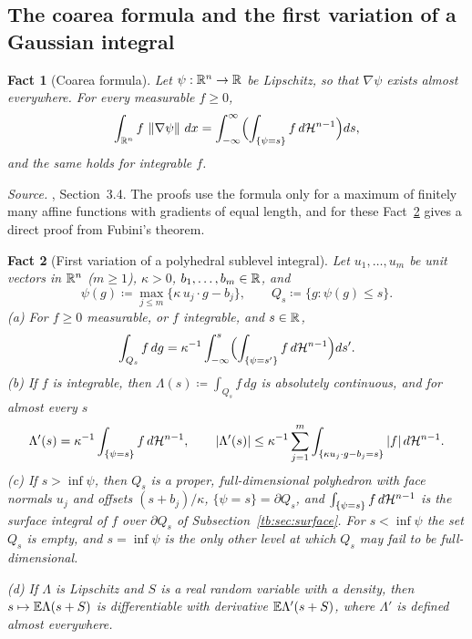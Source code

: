 \documentclass[11pt,letterpaper]{article}
\theoremstyle{plain}
\newtheorem{fact}{Fact}[section]
\begin{document}
\subsection{The coarea formula and the first variation of a Gaussian
integral}\label{tb:sec:coarea}

\begin{fact}[Coarea formula]\label{tb:coarea}
Let \(\psi:\mathbb R^n\to\mathbb R\) be Lipschitz, so that \(\nabla\psi\) exists almost
everywhere. For every measurable \(f\ge0\),
\[
 \int_{\mathbb R^n}f\,\left\lVert\nabla\psi\right\rVert\,dx=\int_{-\infty}^\infty
 \Bigl(\int_{\{\psi=s\}}f\,d\mathcal H^{n-1}\Bigr)ds ,
\]
and the same holds for integrable \(f\).
\end{fact}

\emph{Source.} , Section~3.4. The proofs use the formula only for
a maximum of finitely many affine functions with gradients of equal length, and
for these Fact~\ref{tb:variation} gives a direct proof from Fubini's theorem.

\begin{fact}[First variation of a polyhedral sublevel integral]\label{tb:variation}
Let \(u_1,\ldots,u_m\) be unit vectors in \(\mathbb R^n\) (\(m\ge1\)), \(\kappa>0\),
\(b_1,\ldots,b_m\in\mathbb R\), and
\[
 \psi(g)\coloneqq \max_{j\le m}\{\kappa\,u_j\cdot g-b_j\},\qquad Q_s\coloneqq \{g:\psi(g)\le s\}.
\]
(a) For \(f\ge0\) measurable, or \(f\) integrable, and \(s\in\mathbb R\),
\[
 \int_{Q_s}f\,dg=\kappa^{-1}\int_{-\infty}^s\Bigl(\int_{\{\psi=s'\}}f\,d\mathcal H^{n-1}
 \Bigr)ds'.
\]
(b) If \(f\) is integrable, then \(\Lambda(s)\coloneqq \int_{Q_s}f\,dg\) is absolutely
continuous, and for almost every \(s\)
\[
 \Lambda'(s)=\kappa^{-1}\int_{\{\psi=s\}}f\,d\mathcal H^{n-1},\qquad
 |\Lambda'(s)|\le\kappa^{-1}\sum_{j=1}^m\int_{\{\kappa u_j\cdot g-b_j=s\}}|f|\,d\mathcal H^{n-1}.
\]
(c) If \(s>\inf\psi\), then \(Q_s\) is a proper, full-dimensional polyhedron
with face normals \(u_j\) and offsets \((s+b_j)/\kappa\), \(\{\psi=s\}=\partial Q_s\),
and \(\int_{\{\psi=s\}}f\,d\mathcal H^{n-1}\) is the surface integral of \(f\) over
\(\partial Q_s\) of Subsection~\ref{tb:sec:surface}. For \(s<\inf\psi\) the set
\(Q_s\) is empty, and \(s=\inf\psi\) is the only other level at which \(Q_s\)
may fail to be full-dimensional.

(d) If \(\Lambda\) is Lipschitz and \(S\) is a real random variable with a
density, then \(s\mapsto\mathbb E\Lambda(s+S)\) is differentiable with derivative
\(\mathbb E\Lambda'(s+S)\), where \(\Lambda'\) is defined almost everywhere.
\end{fact}
\end{document}
